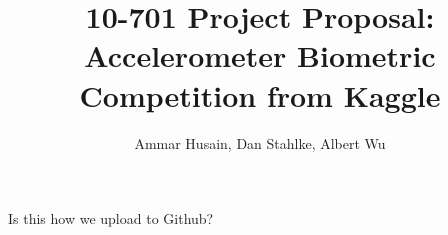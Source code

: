 \documentclass{article}
\title{10-701 Project Proposal: Accelerometer Biometric Competition from Kaggle}
\author{Ammar Husain, Dan Stahlke, Albert Wu} \date{}
\begin{document}
\maketitle{}
Is this how we upload to Github?
\end{document}
